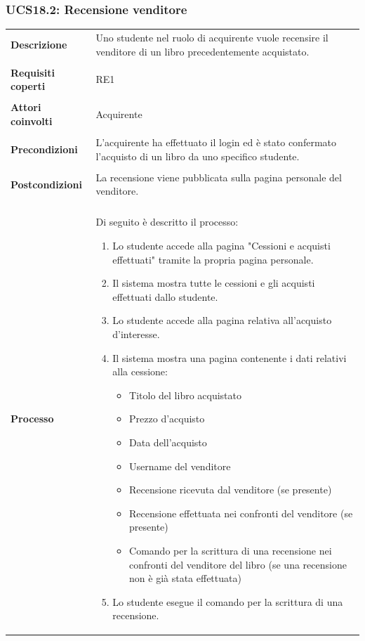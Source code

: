\documentclass[10pt,a4paper]{report}
\begin{document}
	\subsubsection{UCS18.2: Recensione venditore}
	\begin{tabular}{lp{}}
		\textbf{Descrizione}&Uno studente nel ruolo di acquirente vuole recensire il venditore di un libro precedentemente acquistato.\\
		\\
		\textbf{Requisiti coperti}&RE1\\
		\\
		\textbf{Attori coinvolti}&Acquirente\\
		\\
		\textbf{Precondizioni}&L'acquirente ha effettuato il login ed è stato confermato l'acquisto di un libro da uno specifico studente.\\
		\\
		\textbf{Postcondizioni}&La recensione viene pubblicata sulla pagina personale del venditore.\\
		\\
		\textbf{Processo}&Di seguito è descritto il processo:
		\begin{enumerate}
			\item Lo studente accede alla pagina "Cessioni e acquisti effettuati" tramite la propria pagina personale.
			\item Il sistema mostra tutte le cessioni e gli acquisti effettuati dallo studente.
			\item Lo studente accede alla pagina relativa all'acquisto d'interesse.
			\item Il sistema mostra una pagina contenente i dati relativi alla cessione:
			\begin{itemize}
				\item Titolo del libro acquistato
				\item Prezzo d'acquisto
				\item Data dell'acquisto
				\item Username del venditore
				\item Recensione ricevuta dal venditore (se presente)
				\item Recensione effettuata nei confronti del venditore (se presente)
				\item Comando per la scrittura di una recensione nei confronti del venditore del libro (se una recensione non è già stata effettuata)
			\end{itemize}
			\item Lo studente esegue il comando per la scrittura di una recensione.

\end{enumerate}
\end{tabular}
\end{document}
